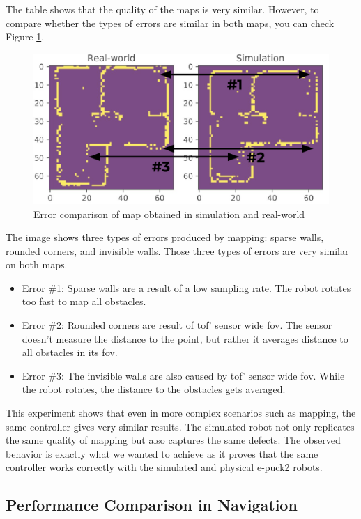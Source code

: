 The table shows that the quality of the maps is very similar.
However, to compare whether the types of errors are similar in both maps, you can check Figure \ref{fig:results:map_features}.

\begin{figure}[H]
    \centering
    \includegraphics[width=\textwidth]{./results/figures/map_features.pdf}
    \caption{Error comparison of map obtained in simulation and real-world}
    \label{fig:results:map_features}
\end{figure}

The image shows three types of errors produced by mapping: sparse walls, rounded corners, and invisible walls.
Those three types of errors are very similar on both maps.
\begin{itemize}
    \item Error \#1: Sparse walls are a result of a low sampling rate. The robot rotates too fast to map all obstacles.
    \item Error \#2: Rounded corners are result of \ac{tof}' sensor wide \ac{fov}. The sensor doesn't measure the distance to the point, but rather it averages distance to all obstacles in its \ac{fov}.
    \item Error \#3: The invisible walls are also caused by \ac{tof}' sensor wide \ac{fov}. While the robot rotates, the distance to the obstacles gets averaged.
\end{itemize}

This experiment shows that even in more complex scenarios such as mapping, the same controller gives very similar results.
The simulated robot not only replicates the same quality of mapping but also captures the same defects. 
The observed behavior is exactly what we wanted to achieve as it proves that the same controller works correctly with the simulated and physical e-puck2 robots.

\subsection{Performance Comparison in Navigation}
\label{results:subsec:phy_navigation}

